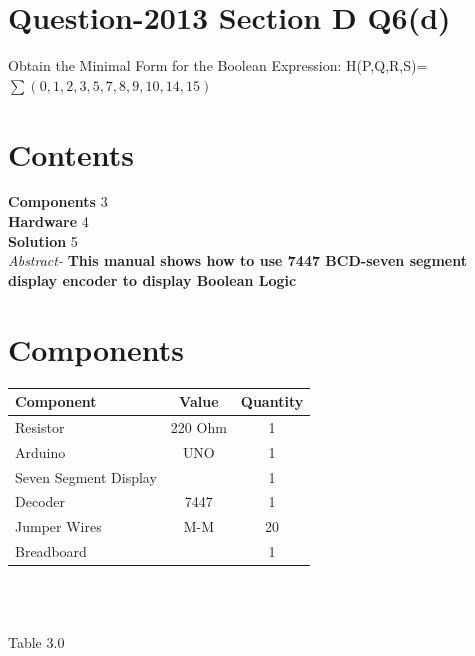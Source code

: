 \documentclass[10pt]{report}
\begin{document}
\begin{multicols}{2} 
\section{Question-2013 Section D Q6(d)}
Obtain the Minimal Form for the Boolean Expression:
H(P,Q,R,S)=$\sum(0,1,2,3,5,7,8,9,10,14,15)$
\section{Contents}
\raggedright
\textbf{Components}
\hspace{10em} 3
\\\textbf{Hardware}
\hspace{11.3em}   4
\\\textbf{Solution}
\hspace{12.1em}   5\\
\textit{Abstract-}
\textbf{This manual shows how to use 7447 BCD-seven segment display encoder to display Boolean Logic}
\section{Components}
\centering
\begin{tabular}{|l|c|c|}
\hline
Component & Value & Quantity\\
\hline
Resistor & 220 Ohm & 1\\
\hline
Arduino & UNO & 1\\
\hline
Seven Segment Display & & 1\\
\hline
Decoder & 7447 & 1\\
\hline
Jumper Wires & M-M & 20\\
\hline
Breadboard & & 1\\
\hline
\end{tabular}\\
\
\centerline{Table 3.0}

\end{multicols}
\end{document}
